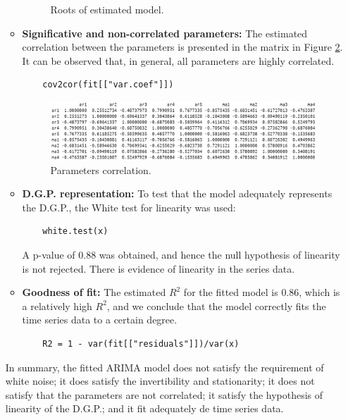 \documentclass[fleqn]{article}
\begin{document}
\begin{enumerate}
\begin{itemize}
\begin{figure}[H]
    \caption{Roots of estimated model.}
    \label{fig:roots}
\end{figure}
\item \textbf{Significative and non-correlated parameters:} The estimated correlation between the parameters is presented in the matrix in Figure \ref{fig:corr}. It can be observed that, in general, all parameters are highly correlated.
\begin{verbatim}
    cov2cor(fit[["var.coef"]])
\end{verbatim}
\begin{figure}[H]
    \centering
    \includegraphics[scale=0.4]{figs/corr.png}
    \caption{Parameters correlation.}
    \label{fig:corr}
\end{figure}
\item \textbf{D.G.P. representation:} To test that the model adequately represents the D.G.P., the White test for linearity was used:
\begin{verbatim}
    white.test(x)
\end{verbatim}
A p-value of 0.88 was obtained, and hence the null hypothesis of linearity is not rejected. There is evidence of linearity in the series data.
\item \textbf{Goodness of fit:} The estimated $R^2$ for the fitted model is 0.86, which is a relatively high $R^2$, and we conclude that the model correctly fits the time series data to a certain degree.
\begin{verbatim}
    R2 = 1 - var(fit[["residuals"]])/var(x)
\end{verbatim}
\end{itemize}
In summary, the fitted ARIMA model does not satisfy the requirement of white noise; it does satisfy the invertibility and stationarity; it does not satisfy that the parameters are not correlated; it satisfy the hypothesis of linearity of the D.G.P.; and it fit adequately de time series data.
\end{enumerate}
\end{document}
